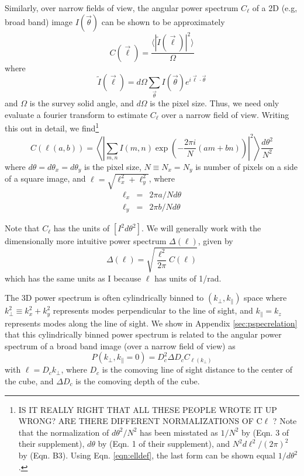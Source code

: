 \documentclass[preprint]{aastex}
\begin{document}
Similarly, over narrow fields of view, the angular power spectrum $C_\ell$ of a 2D (e.g, broad band) image $I(\vec{\theta})$ can be shown to be approximately
\begin{equation}
\label{eqn:Cldef0}
	C(\vec{\ell}) = \frac{\langle|\tilde{I}(\vec{\ell})|^2\rangle}{\Omega} 
\end{equation}
where
\begin{equation}
	\tilde{I}(\vec{\ell})=d\Omega\sum_{\vec{\theta}}I(\vec{\theta})e^{i\vec{\ell}\cdot\vec{\theta}}
\end{equation}
and $\Omega$ is the survey solid angle, and $d\Omega$ is the pixel size. Thus, we need only evaluate a fourier transform to estimate $C_\ell$ over a narrow field of view. Writing this out in detail, we find\footnote{IS IT REALLY RIGHT THAT ALL THESE PEOPLE WROTE IT UP WRONG? ARE THERE DIFFERENT NORMALIZATIONS OF C$\ell$ ? Note that the normalization of $d\theta^2/N^2$ has been misstated as $1/N^2$ by \citet{zemcov14} (Eqn. 3 of their supplement), $d\theta$ by \citet{cooray12} (Eqn. 1 of their supplement), and $N^2d\ell^2/(2\pi)^2$ by \citet{thacker15} (Eqn. B3). Using Eqn. \ref{eqn:elldef}, the last form can be shown equal $1/d\theta^2$.} 
\begin{equation}
\label{eqn:Cldef}
	C(\ell(a,b))=\left\langle\left|\sum_{m,n}I(m,n)\exp\left(-\frac{2\pi i}{N}  (am+bn)\right)\right|^2\right\rangle\frac{d\theta^2}{N^2}
\end{equation}
where $d\theta=d\theta_x=d\theta_y$ is the pixel size, $N\equiv N_x=N_y$ is number of pixels on a side of a square image, and $\ell=\sqrt{\ell_x^2+\ell_y^2}$, where 
\begin{eqnarray}
\ell_x&=&2\pi a/N d\theta \label{eqn:elldef}\\
\ell_y&=&2\pi b/Nd\theta \label{eqn:elldef2}
\end{eqnarray}

Note that $C_\ell$ has the units of $[I^2d\theta^2]$. We will generally work with the dimensionally more intuitive power spectrum $\Delta(\ell)$, given by
\begin{equation}
	\Delta(\ell)=\sqrt{\frac{\ell^2}{2\pi}C(\ell)}
\end{equation}
which has the same units as I because $\ell$ has units of 1/rad. 

The 3D power spectrum is often cylindrically binned to $(k_\perp,k_\parallel)$ space where $k_\perp^2\equiv k_x^2+k_y^2$ represents modes perpendicular to the line of sight, and $k_\parallel=k_z$ represents modes along the line of sight. We show in Appendix \ref{sec:pspecrelation}  that this cylindrically binned power spectrum is related to the angular power spectrum of a broad band image (over a narrow field of view) as
\begin{equation}
P(k_\perp,k_\parallel=0)=D_c^2 \Delta D_c C_{\ell(k_\perp)}	
\end{equation}
with $\ell=D_c k_\perp$, where $D_c$ is the comoving line of sight distance to the center of the cube, and $\Delta D_c$ is the comoving depth of the cube.
\end{document}
